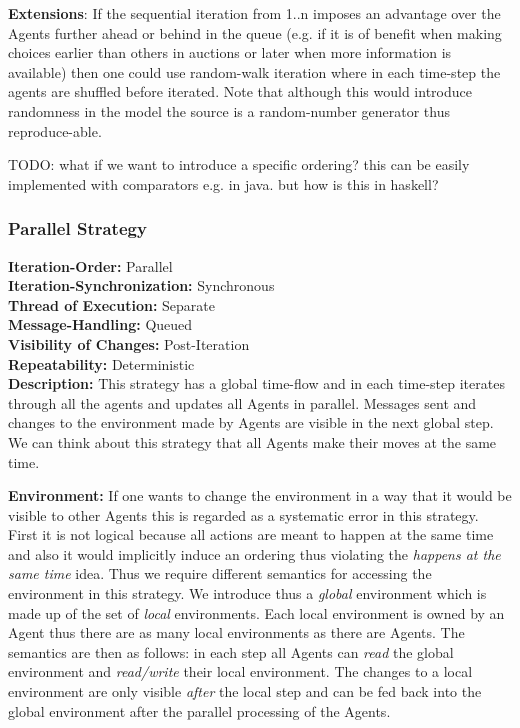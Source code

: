 \textbf{Extensions}: If the sequential iteration from 1..n imposes an advantage over the Agents further ahead or behind in the queue (e.g. if it is of benefit when making choices earlier than others in auctions or later when more information is available) then one could use random-walk iteration where in each time-step the agents are shuffled before iterated. Note that although this would introduce randomness in the model the source is a random-number generator thus reproduce-able.
	
TODO: what if we want to introduce a specific ordering? this can be easily implemented with comparators e.g. in java. but how is this in haskell?

\subsubsection{Parallel Strategy}
\textbf{Iteration-Order:} Parallel \\
\textbf{Iteration-Synchronization:}	Synchronous \\
\textbf{Thread of Execution:} Separate \\
\textbf{Message-Handling:} Queued \\
\textbf{Visibility of Changes:}	Post-Iteration \\
\textbf{Repeatability:}	Deterministic \\

\textbf{Description:} This strategy has a global time-flow and in each time-step iterates through all the agents and updates all Agents in parallel. Messages sent and changes to the environment made by Agents are visible in the next global step. We can think about this strategy that all Agents make their moves at the same time. 

\textbf{Environment:} If one wants to change the environment in a way that it would be visible to other Agents this is regarded as a systematic error in this strategy. First it is not logical because all actions are meant to happen at the same time and also it would implicitly induce an ordering thus violating the \textit{happens at the same time} idea. Thus we require different semantics for accessing the environment in this strategy. We introduce thus a \textit{global} environment which is made up of the set of \textit{local} environments. Each local environment is owned by an Agent thus there are as many local environments as there are Agents. The semantics are then as follows: in each step all Agents can \textit{read} the global environment and \textit{read/write} their local environment. The changes to a local environment are only visible \textit{after} the local step and can be fed back into the global environment after the parallel processing of the Agents.

